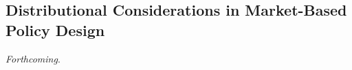 

\subsection{Distributional Considerations in Market-Based Policy Design}

\textit{Forthcoming}.


